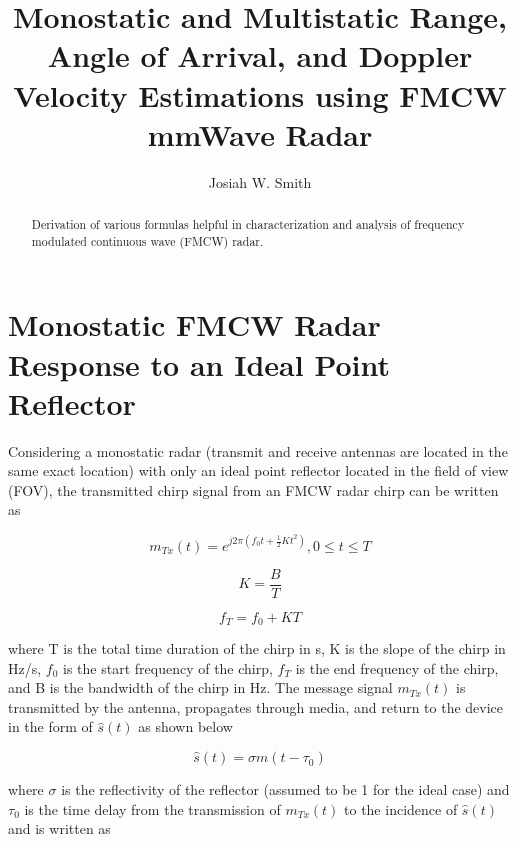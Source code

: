 \documentclass{IEEEtran}
\title{Monostatic and Multistatic Range, Angle of Arrival, and Doppler Velocity Estimations using FMCW mmWave Radar}
\author{Josiah W. Smith}
\begin{document}
\maketitle

\begin{abstract}

Derivation of various formulas helpful in characterization and analysis of frequency modulated continuous wave (FMCW) radar.

\end {abstract}



\section{Monostatic FMCW Radar Response to an Ideal Point Reflector}
Considering a monostatic radar (transmit and receive antennas are located in the same exact location) with only an ideal point reflector located in the field of view (FOV), the transmitted chirp signal from an FMCW radar chirp can be written as

\begin{equation}
    m_{Tx}(t) = e^{j2\pi (f_0 t + \frac{1}{2} K t^2 )}, 0 \leq t \leq T
\end{equation}

\begin{equation}
    K = \frac{B}{T}
\end{equation}

\begin{equation}
    f_T = f_0 + KT
\end{equation}

where T is the total time duration of the chirp in s, K is the slope of the chirp in Hz/s, $f_0$ is the start frequency of the chirp, $f_T$ is the end frequency of the chirp, and B is the bandwidth of the chirp in Hz. The message signal $m_{Tx}(t)$ is transmitted by the antenna, propagates through media, and return to the device in the form of $\hat{s}(t)$ as shown below

\begin{equation}
    \hat{s}(t) = \sigma m(t-\tau_0)
\end{equation}

where $\sigma$ is the reflectivity of the reflector (assumed to be 1 for the ideal case) and $\tau_0$ is the time delay from the transmission of $m_{T x}(t)$ to the incidence of $\hat{s}(t)$ and is written as
\end{document}
